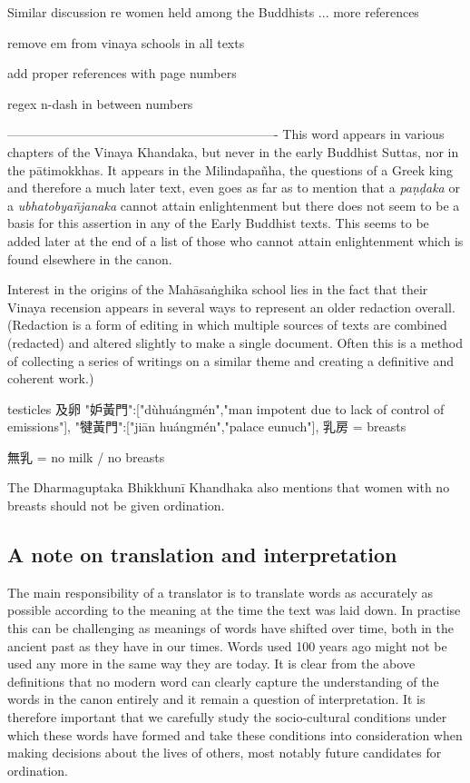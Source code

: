 Similar discussion re women held among the Buddhists ... more references

remove em from vinaya schools in all texts

add proper references with page numbers

regex n-dash in between numbers

----------------------------------------------------------------
This word appears in various chapters of the Vinaya Khandaka, but never in the early Buddhist Suttas, nor in the pātimokkhas. It appears in the Milindapañha, the questions of a Greek king and therefore a much later text, even goes as far as to mention that a {\em paṇḍaka } or a {\em ubhatob­yañ­janaka } cannot attain enlightenment but there does not seem to be a basis for this assertion in any of the Early Buddhist texts. This seems to be added later at the end of a list of those who cannot attain enlightenment which is found elsewhere in the canon.

Interest in the origins of the Mahāsaṅghika school lies in the fact that their Vinaya recension appears in several ways to represent an older redaction overall. (Redaction is a form of editing in which multiple sources of texts are combined (redacted) and altered slightly to make a single document. Often this is a method of collecting a series of writings on a similar theme and creating a definitive and coherent work.)

testicles 及卵
"妒黃門":["dùhuángmén","man impotent due to lack of control of emissions"],
"犍黃門":["jiān huángmén","palace eunuch"],
乳房 = breasts

無乳 = no milk / no breasts

The Dharmaguptaka Bhikkhunī Khandhaka also mentions that women with no breasts should not be given ordination.

\subsection{A note on translation and interpretation}
The main responsibility of a translator is to translate words as accurately as possible according to the meaning at the time the text was laid down. In practise this can be challenging as meanings of words have shifted over time, both in the ancient past as they have in our times. Words used 100 years ago might not be used any more in the same way they are today. It is clear from the above definitions that no modern word can clearly capture the understanding of the words in the canon entirely and it remain a question of interpretation. It is therefore important that we carefully study the socio-cultural conditions under which these words have formed and take these conditions into consideration when making decisions about the lives of others, most notably future candidates for ordination.


